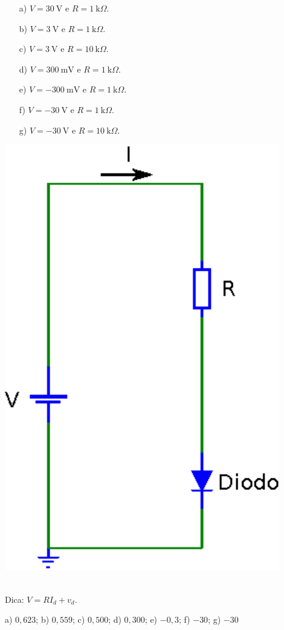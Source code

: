 \begin{minipage}[l]{0.6\linewidth}
\begin{itemize}
\item[a)] $V=30~\mbox{V}$ e $R=1~\mbox{k}\Omega$.
\item[b)] $V=3~\mbox{V}$ e $R=1~\mbox{k}\Omega$.
\item[c)] $V=3~\mbox{V}$ e $R=10~\mbox{k}\Omega$.
\item[d)] $V=300~\mbox{mV}$ e $R=1~\mbox{k}\Omega$.
\item[e)] $V=-300~\mbox{mV}$ e $R=1~\mbox{k}\Omega$.
\item[f)] $V=-30~\mbox{V}$ e $R=1~\mbox{k}\Omega$.
\item[g)] $V=-30~\mbox{V}$ e $R=10~\mbox{k}\Omega$.
\end{itemize}\end{minipage}\begin{minipage}[c]{0.4\linewidth}
\includegraphics[width=0.9\textwidth]{./cap_equacao1d/pics/circuito_diodo.eps}
\end{minipage}\\
Dica: $V=RI_d+v_d$.
\begin{Answer}
  \begin{tiny}
    a) $0,623$; b) $0,559$; c) $0,500$; d) $0,300$; e) $-0,3$; f) $-30$; g) $-30$
  \end{tiny}
\end{Answer}

